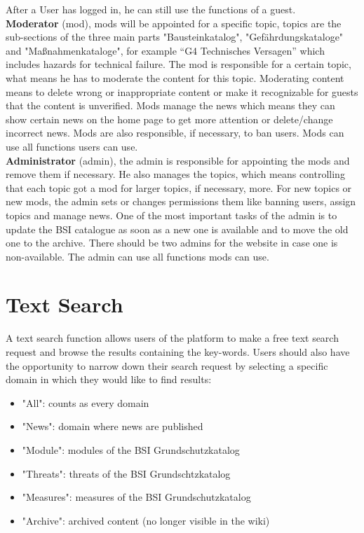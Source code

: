 After a User has logged in, he can still use the functions of a guest.
\\
\textbf{Moderator} (mod), mods will be appointed for a specific topic, topics are the sub-sections of the three main parts "Bausteinkatalog", "Gefährdungskataloge" and "Maßnahmenkataloge", for example “G4 Technisches Versagen” which includes hazards for technical failure. 
The mod is responsible for a certain topic, what means he has to moderate the content for this topic. 
Moderating content means to delete wrong or inappropriate content or make it recognizable for guests that the content is unverified.  
Mods manage the news which means they can show certain news on the home page to get more attention or delete/change incorrect news. 
Mods are also responsible, if necessary, to ban users. 
Mods can use all functions users can use.
\\
\textbf{Administrator} (admin), the admin is responsible for appointing the mods and remove them if necessary. He also manages the topics, which means controlling that each topic got a mod for larger topics, if necessary, more. 
For new topics or new mods, the admin sets or changes permissions them like banning users, assign topics and manage news. 
One of the most important tasks of the admin is to update the BSI catalogue as soon as a new one is available and to move the old one to the archive.  There should be two admins for the website in case one is non-available.
The admin can use all functions mods can use. 


\section{Text Search}
\label{search_function}
A text search function allows users of the platform to make a free text search request and browse the results containing the key-words. 
Users should also have the opportunity to narrow down their search request by selecting a specific domain in which they would like to find results:
\begin{itemize}
\item "All": counts as every domain
\item "News": domain where news are published
\item "Module": modules of the BSI Grundschutzkatalog
\item "Threats": threats of the BSI Grundschtzkatalog
\item "Measures": measures of the BSI Grundschutzkatalog
\item "Archive": archived content (no longer visible in the wiki)
\end{itemize}
 
